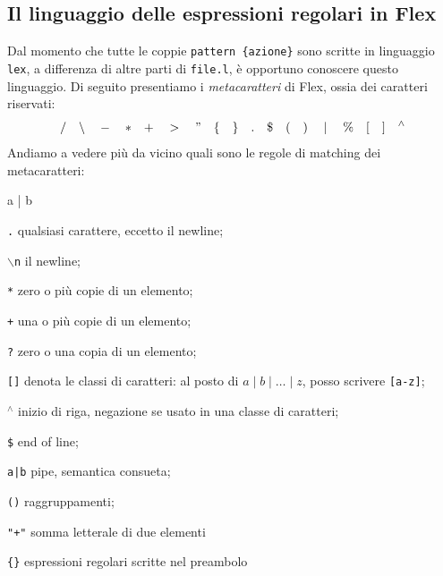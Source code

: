 \documentclass[class=book, crop=false, oneside, 12pt]{standalone}
\begin{document}
\subsection{Il linguaggio delle espressioni regolari in Flex}
Dal momento che tutte le coppie \texttt{pattern \{azione\}} sono scritte in linguaggio \texttt{lex}, a differenza di altre parti di \texttt{file.l}, è opportuno conoscere questo linguaggio. Di seguito presentiamo i \emph{metacaratteri} di Flex, ossia dei caratteri riservati:
\begin{equation*}
    \slash \quad \backslash \quad - \quad * \quad + \quad >\quad " \quad \{ \quad \} \quad . \quad \$ \quad ( \quad ) \quad \mid \quad \% \quad [ \quad ] \quad ^\wedge
\end{equation*}
\noindent Andiamo a vedere più da vicino quali sono le regole di matching dei metacaratteri:
\begin{labeling}{a | b}
    \item[\texttt{.}] qualsiasi carattere, eccetto il newline;
    \item[\texttt{\(\backslash\)n}] il newline;
    \item[\texttt{*}] zero o più copie di un elemento;
    \item[\texttt{+}] una o più copie di un elemento;
    \item[\texttt{?}] zero o una copia di un elemento;
    \item[\texttt{[]}] denota le classi di caratteri: al posto di \(a \mid b \mid \ldots \mid z\), posso scrivere \texttt{[a-z]};
    \item[\texttt{\(^\wedge\)}] inizio di riga, negazione se usato in una classe di caratteri;
    \item[\texttt{\$}] end of line;
    \item[\texttt{a|b}] pipe, semantica consueta;
    \item[\texttt{()}] raggruppamenti;
    \item[\texttt{"+"}] somma letterale di due elementi
    \item[\texttt{\{\}}] espressioni regolari scritte nel preambolo
\end{labeling}
\end{document}
